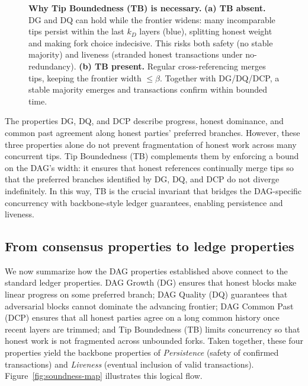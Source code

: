 \begin{figure}[htp!]
\caption{\textbf{Why Tip Boundedness (TB) is necessary.}
\small
\textbf{(a) TB absent.} DG and DQ can hold while the frontier widens: many incomparable tips persist
within the last $k_D$ layers (blue), splitting honest weight and making fork choice indecisive. This risks
both safety (no stable majority) and liveness (stranded honest transactions under no-redundancy).
\textbf{(b) TB present.} Regular cross-referencing merges tips, keeping the frontier width $\le \beta$.
Together with DG/DQ/DCP, a stable majority emerges and transactions confirm within bounded time.}
\label{fig:tb-necessity}
\end{figure}



\begin{remark}
The properties DG, DQ, and DCP describe progress, 
honest dominance, and common past agreement along honest parties’ preferred branches. 
However, these three properties alone do not prevent fragmentation of honest work 
across many concurrent tips. 
Tip Boundedness (TB) complements them by enforcing a bound on the DAG’s width: 
it ensures that honest references continually merge tips so that the preferred branches 
identified by DG, DQ, and DCP do not diverge indefinitely. 
In this way, TB is the crucial invariant that bridges the DAG-specific concurrency 
with backbone-style ledger guarantees, enabling persistence and liveness.
\end{remark}


\subsection{From consensus properties to ledge properties} 
We now summarize how the DAG properties established above connect to the standard ledger
properties. DAG Growth (DG) ensures that honest blocks make linear progress on some preferred
branch; DAG Quality (DQ) guarantees that adversarial blocks cannot dominate the advancing
frontier; DAG Common Past (DCP) ensures that all honest parties agree on a long common
history once recent layers are trimmed; and Tip Boundedness (TB) limits concurrency so that
honest work is not fragmented across unbounded forks. Taken together, these four properties
yield the backbone properties of \emph{Persistence} (safety of confirmed transactions) and
\emph{Liveness} (eventual inclusion of valid transactions). Figure~\ref{fig:soundness-map}
illustrates this logical flow.

